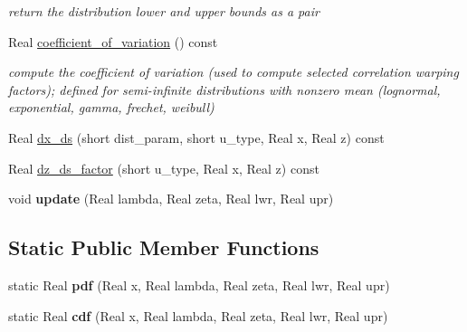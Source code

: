 \begin{DoxyCompactItemize}
\begin{DoxyCompactList}\small\item\em return the distribution lower and upper bounds as a pair \end{DoxyCompactList}\item 
Real \hyperlink{classPecos_1_1BoundedLognormalRandomVariable_ae1cf1c07047d7ad9dbb899aa01138d54}{coefficient\+\_\+of\+\_\+variation} () const 
\begin{DoxyCompactList}\small\item\em compute the coefficient of variation (used to compute selected correlation warping factors); defined for semi-\/infinite distributions with nonzero mean (lognormal, exponential, gamma, frechet, weibull) \end{DoxyCompactList}\item 
Real \hyperlink{classPecos_1_1BoundedLognormalRandomVariable_af889af8adfb262c9b74f573b2a9ffc99}{dx\+\_\+ds} (short dist\+\_\+param, short u\+\_\+type, Real x, Real z) const 
\item 
Real \hyperlink{classPecos_1_1BoundedLognormalRandomVariable_af6b5fc528523180bed5fc3008dcea205}{dz\+\_\+ds\+\_\+factor} (short u\+\_\+type, Real x, Real z) const 
\item 
void {\bfseries update} (Real lambda, Real zeta, Real lwr, Real upr)\label{classPecos_1_1BoundedLognormalRandomVariable_a9c7ca27852bfe1675122029df010234b}

\end{DoxyCompactItemize}
\subsection*{Static Public Member Functions}
\begin{DoxyCompactItemize}
\item 
static Real {\bfseries pdf} (Real x, Real lambda, Real zeta, Real lwr, Real upr)\label{classPecos_1_1BoundedLognormalRandomVariable_aa24b8af7eee1d8dadf31167bd93a02b0}

\item 
static Real {\bfseries cdf} (Real x, Real lambda, Real zeta, Real lwr, Real upr)\label{classPecos_1_1BoundedLognormalRandomVariable_a7a57d35555a34b211c5f35fe8f0a1cfc}

\end{DoxyCompactItemize}
